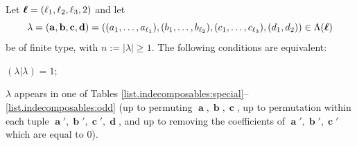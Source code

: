\documentclass[12pt,reqno]{amsart}
\begin{document}
\begin{theorem}
\label{T:indecomposables}
Let $\boldsymbol{\ell}=(\ell_1,\ell_2,\ell_3,2)$ and let
$$
\lambda=(\mathbf{a},\mathbf{b},\mathbf{c},\mathbf{d})=((a_1,\ldots,a_{\ell_1}),(b_1,\ldots,b_{\ell_2}),(c_1,\ldots,c_{\ell_3}),(d_1,d_2))\in\Lambda(\boldsymbol{\ell})
$$
be of finite type, with $n:=|\lambda|\geq 1$.
The following conditions are equivalent:
\begin{penumerate}
    \item $(\lambda|\lambda)=1$;
    \item $\lambda$ appears in one of Tables \ref{list.indecomposables:special}--\ref{list.indecomposables:odd} (up to permuting $\mbfa,\mbfb,\mbfc$, up to permutation within each tuple $\mbfa',\mbfb',\mbfc',\mbfd$, and up to removing the coefficients of $\mbfa',\mbfb',\mbfc'$ which are equal to $0$).
\end{penumerate}


\end{theorem}
\end{document}
